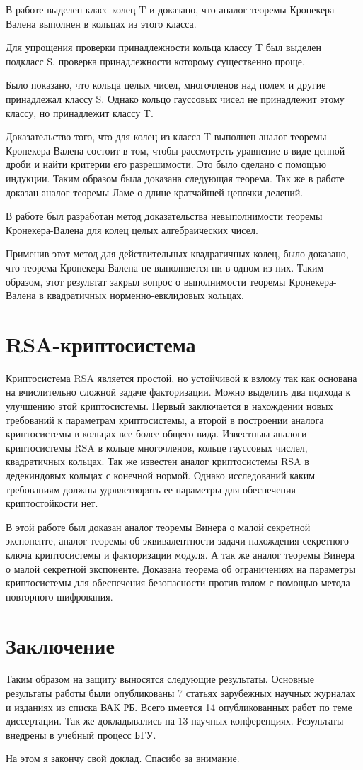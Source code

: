 \documentclass[a4paper,12pt]{article} %
\begin{document}
В работе выделен класс колец T и доказано, что аналог теоремы Кронекера-Валена выполнен в кольцах из этого класса.

Для упрощения проверки принадлежности кольца классу T был выделен подкласс S, проверка принадлежности которому существенно проще.

Было показано, что кольца целых чисел, многочленов над полем и другие принадлежал классу S.
Однако кольцо гауссовых чисел не принадлежит этому классу, но принадлежит классу T.

Доказательство того, что для колец из класса T выполнен аналог теоремы Кронекера-Валена состоит в том, чтобы рассмотреть уравнение в виде цепной дроби и найти критерии его разрешимости.
Это было сделано с помощью индукции.
Таким образом была доказана следующая теорема.
Так же в работе доказан аналог теоремы Ламе о длине кратчайшей цепочки делений.

В работе был разработан метод доказательства невыполнимости теоремы Кронекера-Валена для колец целых алгебраических чисел.

Применив этот метод для действительных квадратичных колец, было доказано, что теорема Кронекера-Валена не выполняется ни в одном из них.
Таким образом, этот результат закрыл вопрос о выполнимости теоремы Кронекера-Валена в квадратичных норменно-евклидовых кольцах.

\section{RSA-криптосистема}

Криптосистема RSA является простой, но устойчивой к взлому так как основана на вчислительно сложной задаче факторизации.
Можно выделить два подхода к улучшению этой криптосистемы.
Первый заключается в нахождении новых требований к параметрам криптосистемы, а второй в построении аналога криптосистемы в кольцах все более общего вида.
Известныы аналоги криптосистемы RSA в кольце многочленов, кольце гауссовых числел, квадратичных кольцах.
Так же известен аналог криптосистемы RSA в дедекиндовых кольцах с конечной нормой.
Однако исследований каким требованиям должны удовлетворять ее параметры для обеспечения криптостойкости нет.

В этой работе был доказан аналог теоремы Винера о малой секретной экспоненте, аналог теоремы об эквивалентности задачи нахождения секретного ключа криптосистемы и факторизации модуля.
А так же аналог теоремы Винера о малой секретной экспоненте.
Доказана теорема об ограничениях на параметры криптосистемы для обеспечения безопасности против взлом с помощью метода повторного шифрования.

\section{Заключение}

Таким образом на защиту выносятся следующие результаты.
Основные результаты работы были опубликованы 7 статьях зарубежных научных журналах и изданиях из списка ВАК РБ.
Всего имеется 14 опубликованных работ по теме диссертации.
Так же докладывались на 13 научных конференциях.
Результаты внедрены в учебный процесс БГУ.

На этом я закончу свой доклад.
Спасибо за внимание.
\end{document}

